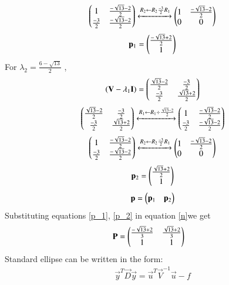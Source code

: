 \documentclass[journal,12pt,twocolumn]{IEEEtran}
\begin{document}
\begin{align}
\begin{pmatrix}
    1 &\frac{-\sqrt{13}-2}{2}\\
    \frac{-3}{2} & \frac{-\sqrt{13}-2}{2}
    \end{pmatrix}
    \xleftrightarrow[]{R_2 \leftarrow R_2\frac{-3}{2}R_1}
\begin{pmatrix}
    1 &\frac{-\sqrt{13}-2}{2}\\
    0 &0
    \end{pmatrix}
    \end{align}
    \begin{align}\label{p_1}
    \mathbf p_1=
    \begin{pmatrix}
    \frac{-\sqrt{13}+2}{2}\\1
    \end{pmatrix}
\end{align}
For $\lambda_2=\frac{6-\sqrt{13}}{2}$ ,
\begin{align}
    (\mathbf{V}-\lambda_1\mathbf{I})=\begin{pmatrix}\frac{\sqrt{13}-2}{2} & \frac{-3}{2} \\\frac{-3}{2} & \frac{\sqrt{13}+2}{2}\end{pmatrix}
\end{align}
\begin{align}
   \begin{pmatrix}\frac{\sqrt{13}-2}{2} & \frac{-3}{2} \\\frac{-3}{2} & \frac{\sqrt{13}+2}{2}\end{pmatrix}
    \xleftrightarrow[]{R_1 \leftarrow R_1\div\frac{\sqrt{13}-2}{2}}
    \begin{pmatrix}
    1 &\frac{-\sqrt{13}-2}{2}\\
    \frac{-3}{2} & \frac{-\sqrt{13}-2}{2}
    \end{pmatrix}
\end{align}
\begin{align}
\begin{pmatrix}
    1 &\frac{-\sqrt{13}-2}{2}\\
    \frac{-3}{2} & \frac{-\sqrt{13}-2}{2}
    \end{pmatrix}
    \xleftrightarrow[]{R_2 \leftarrow R_2\frac{-3}{2}R_1}
\begin{pmatrix}
    1 &\frac{-\sqrt{13}-2}{2}\\
    0 &0
    \end{pmatrix}
    \end{align}
    \begin{align}\label{p_2}
    \mathbf p_2=
    \begin{pmatrix}
    \frac{\sqrt{13}+2}{2}\\1
    \end{pmatrix}
    \end{align}
    \begin{align}\label{n}
     \mathbf{p}=\begin{pmatrix}\mathbf p_1 &\mathbf p_2\end{pmatrix}
     \end{align}
    Substituting equations \eqref{p_1}, \eqref{p_2} in equation  \eqref{n}we get 
\begin{align}
    \mathbf{P}&=\begin{pmatrix}\frac{-\sqrt{13}+2}{3} & \frac{\sqrt{13}+2}{3} \\1 & 1\end{pmatrix}\label{eqP}
\end{align}
Standard ellipse can be written in the form:
\begin{align}\label{s}
    \vec{y}^T\vec{D}\vec{y}=\vec{u}^T\vec{V}^{-1}\vec{u}-f
\end{align}
\end{document}
